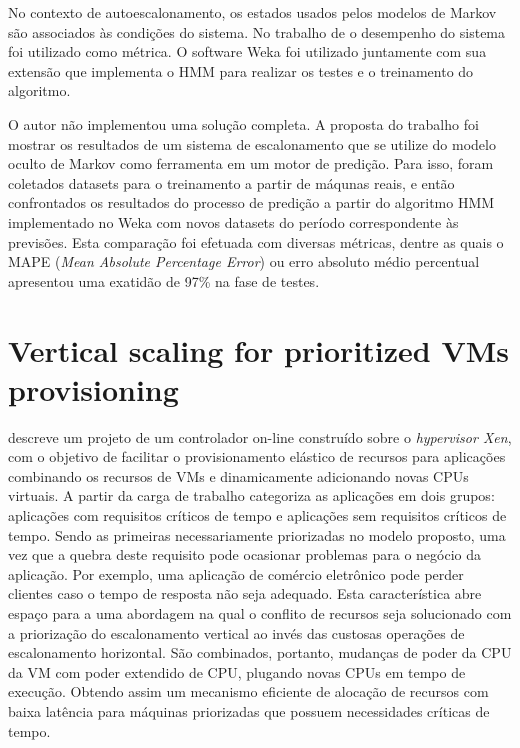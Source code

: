 \documentclass[twoside,english,brazilian]{UNISINOSmonografia}
\begin{document}
No contexto de autoescalonamento, os estados usados pelos modelos de Markov são associados às condições do sistema. No trabalho de \cite{Nikravesh2014} o desempenho do sistema foi utilizado como métrica. O software Weka foi utilizado juntamente com sua extensão que implementa o HMM para realizar os testes e o treinamento do algoritmo.

O autor não implementou uma solução completa. A proposta do trabalho foi mostrar os resultados de um sistema de escalonamento que se utilize do modelo oculto de Markov como ferramenta em um motor de predição. Para isso, foram coletados datasets para o treinamento a partir de máqunas reais, e então confrontados os resultados do processo de predição a partir do algoritmo HMM implementado no Weka com novos datasets do período correspondente às previsões. Esta comparação foi efetuada com diversas métricas, dentre as quais o MAPE (\textit{Mean Absolute Percentage Error}) ou erro absoluto médio percentual apresentou uma exatidão de 97\% na fase de testes.

\section{Vertical scaling for prioritized VMs provisioning}

\cite{Yazdanov2012} descreve um projeto de um controlador on-line construído sobre o \textit{hypervisor Xen}, com o objetivo de facilitar o provisionamento elástico de recursos para aplicações combinando os recursos de VMs e dinamicamente adicionando novas CPUs virtuais. A partir da carga de trabalho \cite{Yazdanov2012} categoriza as aplicações em dois grupos: aplicações com requisitos críticos de tempo e aplicações sem requisitos críticos de tempo. Sendo as primeiras necessariamente priorizadas no modelo proposto, uma vez que a quebra deste requisito pode ocasionar problemas para o negócio da aplicação. Por exemplo, uma aplicação de comércio eletrônico pode perder clientes caso o tempo de resposta não seja adequado. Esta característica abre espaço para a uma abordagem na qual o conflito de recursos seja solucionado com a priorização do escalonamento vertical ao invés das custosas operações de escalonamento horizontal. São combinados, portanto, mudanças de poder da CPU da VM com poder extendido de CPU, plugando novas CPUs em tempo de execução. Obtendo assim um mecanismo eficiente de alocação de recursos com baixa latência para máquinas priorizadas que possuem necessidades críticas de tempo.
\end{document}
